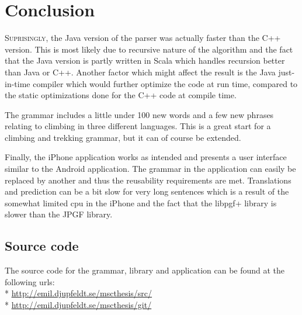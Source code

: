 \chapter{Conclusion}
\lettrine[lines=4, loversize=-0.1, lraise=0.1]{S}{uprisingly}, the Java version of the parser was actually faster than the C++ version. This is most likely due to recursive nature of the algorithm and the fact that the Java version is partly written in Scala which handles recursion better than Java or C++. Another factor which might affect the result is the Java just-in-time compiler which would further optimize the code at run time, compared to the static optimizations done for the C++ code at compile time.

The grammar includes a little under 100 new words and a few new phrases relating to climbing in three different languages. This is a great start for a climbing and trekking grammar, but it can of course be extended.

Finally, the iPhone application works as intended and presents a user interface similar to the Android application. The grammar in the application can easily be replaced by another and thus the reusability requirements are met. Translations and prediction can be a bit slow for very long sentences which is a result of the somewhat limited cpu in the iPhone and the fact that the libpgf+ library is slower than the JPGF library.

\section{Source code}
The source code for the grammar, library and application can be found at the following urls:\\*
\url{http://emil.djupfeldt.se/mscthesis/src/}\\*
\url{http://emil.djupfeldt.se/mscthesis/git/}